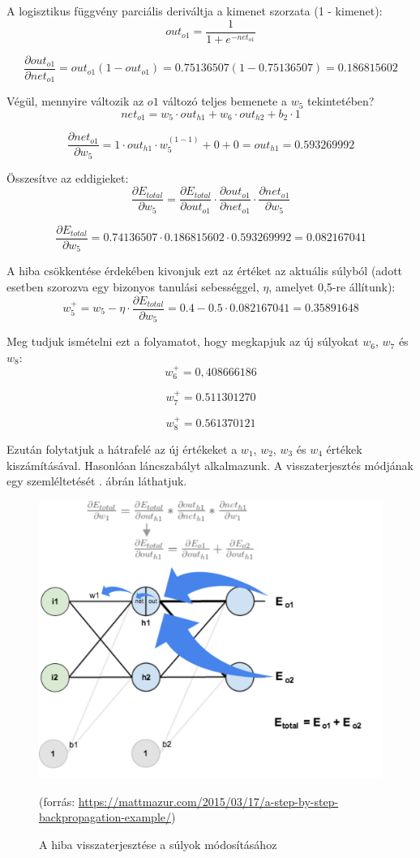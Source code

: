 A logisztikus függvény parciális deriváltja a kimenet szorzata (1 - kimenet):
$$
out_{o1} = \frac{1}{1+e^{-net_{o1}}}
$$

$$
\frac{\partial out_{o1}}{\partial net_{o1}} = out_{o1}(1 - out_{o1}) = 0.75136507(1 - 0.75136507) = 0.186815602
$$

Végül, mennyire változik az $o1$ változó teljes bemenete a $w_5$ tekintetében?
$$
net_{o1} = w_5 \cdot out_{h1} + w_6 \cdot out_{h2} + b_2 \cdot 1
$$

$$
\frac{\partial net_{o1}}{\partial w_{5}} = 1 \cdot out_{h1} \cdot w_5^{(1 - 1)} + 0 + 0 = out_{h1} = 0.593269992
$$

Összesítve az eddigieket:
$$
\frac{\partial E_{total}}{\partial w_{5}} = \frac{\partial E_{total}}{\partial out_{o1}} \cdot \frac{\partial out_{o1}}{\partial net_{o1}} \cdot \frac{\partial net_{o1}}{\partial w_{5}}
$$

$$
\frac{\partial E_{total}}{\partial w_{5}} = 0.74136507 \cdot 0.186815602 \cdot 0.593269992 = 0.082167041
$$

A hiba csökkentése érdekében kivonjuk ezt az értéket az aktuális súlyból (adott esetben szorozva egy bizonyos tanulási sebességgel, $\eta$, amelyet 0,5-re állítunk):
$$
w_5^{+} = w_5 - \eta \cdot \frac{\partial E_{total}}{\partial w_{5}} = 0.4 - 0.5 \cdot 0.082167041 = 0.35891648
$$

Meg tudjuk ismételni ezt a folyamatot, hogy megkapjuk az új súlyokat $w_6$, $w_7$ és $w_8$:
$$
w_6 ^ {+} = 0,408666186
$$

$$
w_7 ^ {+} = 0.511301270
$$

$$
w_8 ^ {+} = 0.561370121
$$

Ezután folytatjuk a hátrafelé az új értékeket a $w_1$, $w_2$, $w_3$ és $w_4$ értékek kiszámításával. Hasonlóan láncszabályt alkalmazunk. A visszaterjesztés módjának egy szemléltetését . ábrán láthatjuk.

\begin{figure}[h]
\centering
\includegraphics[scale=0.5]{images/ANN_bp_viz}
\caption{A hiba visszaterjesztése a súlyok módosításához}
\label{fig:ANN_bp_viz}
(forrás: \url{https://mattmazur.com/2015/03/17/a-step-by-step-backpropagation-example/})
\end{figure}

